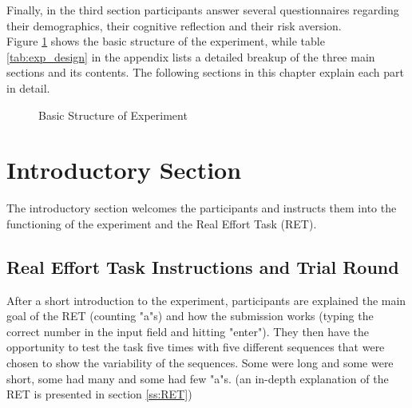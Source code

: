     Finally, in the third section participants answer several questionnaires regarding their demographics, their cognitive reflection and their risk aversion.\\
    
    Figure \ref{fig:exp_str} shows the basic structure of the experiment, while table \ref{tab:exp_design} in the appendix lists a detailed breakup of the three main sections and its contents. The following sections in this chapter explain each part in detail.
    
\begin{figure}
\centering
{}

\caption{Basic Structure of Experiment}
\label{fig:exp_str}
\end{figure}
    
    \section{Introductory Section}
    
    The introductory section welcomes the participants and instructs them into the functioning of the experiment and the Real Effort Task (RET).
    
    \subsection{Real Effort Task Instructions and Trial Round}
    
    After a short introduction to the experiment, participants are explained the main goal of the RET (counting "a"s) and how the submission works (typing the correct number in the input field and hitting "enter"). They then have the opportunity to test the task five times with five different sequences that were chosen to show the variability of the sequences. Some were long and some were short, some had many and some had few "a"s. (an in-depth explanation of the RET is presented in section \ref{ss:RET}) \\
    
